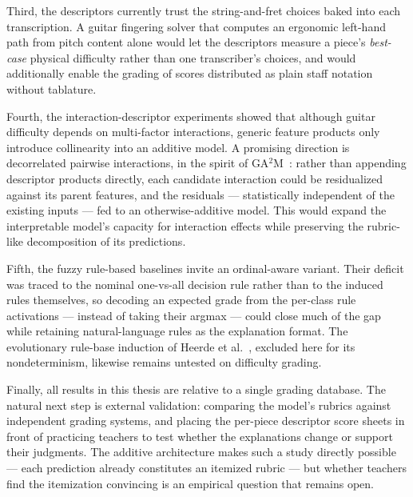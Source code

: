 Third, the descriptors currently trust the string-and-fret choices baked into each transcription. A guitar fingering solver that computes an ergonomic left-hand path from pitch content alone would let the descriptors measure a piece's \emph{best-case} physical difficulty rather than one transcriber's choices, and would additionally enable the grading of scores distributed as plain staff notation without tablature.

Fourth, the interaction-descriptor experiments showed that although guitar difficulty depends on multi-factor interactions, generic feature products only introduce collinearity into an additive model. A promising direction is decorrelated pairwise interactions, in the spirit of GA$^2$M~\cite{caruana2013intelligible}: rather than appending descriptor products directly, each candidate interaction could be residualized against its parent features, and the residuals --- statistically independent of the existing inputs --- fed to an otherwise-additive model. This would expand the interpretable model's capacity for interaction effects while preserving the rubric-like decomposition of its predictions.

Fifth, the fuzzy rule-based baselines invite an ordinal-aware variant. Their deficit was traced to the nominal one-vs-all decision rule rather than to the induced rules themselves, so decoding an expected grade from the per-class rule activations --- instead of taking their argmax --- could close much of the gap while retaining natural-language rules as the explanation format. The evolutionary rule-base induction of Heerde et al.~\cite{heerde2020comparing}, excluded here for its nondeterminism, likewise remains untested on difficulty grading.

Finally, all results in this thesis are relative to a single grading database. The natural next step is external validation: comparing the model's rubrics against independent grading systems, and placing the per-piece descriptor score sheets in front of practicing teachers to test whether the explanations change or support their judgments. The additive architecture makes such a study directly possible --- each prediction already constitutes an itemized rubric --- but whether teachers find the itemization convincing is an empirical question that remains open.
